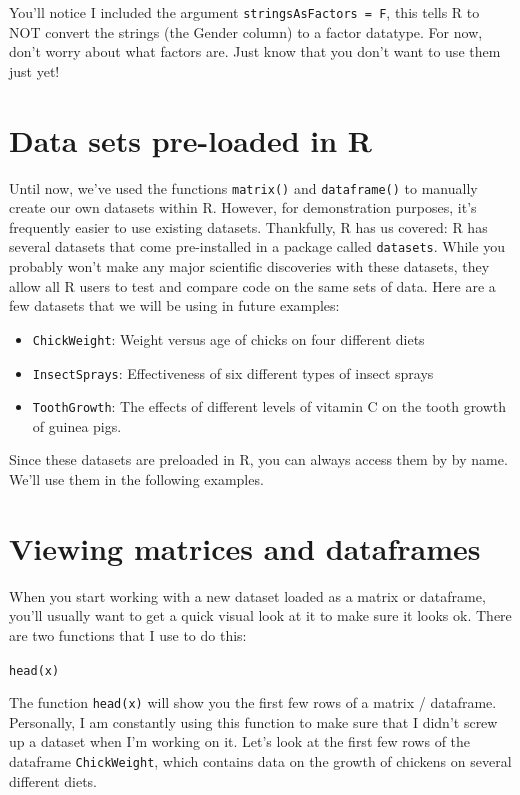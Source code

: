 \documentclass{tufte-book}\usepackage[]{graphicx}\usepackage[]{color}
\newcommand{\newfun}[1]{\begin{LARGE} \begin{center} \texttt{#1} \end{center} \end{LARGE}}
\begin{document}
\begin{footnotesize}
You'll notice I included the argument \texttt{stringsAsFactors = F}, this tells R to NOT convert the strings (the Gender column) to a factor datatype. For now, don't worry about what factors are. Just know that you don't want to use them just yet!

\section{Data sets pre-loaded in R}

Until now, we've used the functions \texttt{matrix()} and \texttt{dataframe()} to manually create our own datasets within R. However, for demonstration purposes, it's frequently easier to use existing datasets. Thankfully, R has us covered: R has several datasets that come pre-installed in a package called \texttt{datasets}. While you probably won't make any major scientific discoveries with these datasets, they allow all R users to test and compare code on the same sets of data. Here are a few datasets that we will be using in future examples:

\begin{itemize}
  \item \texttt{ChickWeight}: Weight versus age of chicks on four different diets
  \item \texttt{InsectSprays}: Effectiveness of six different types of insect sprays
  \item \texttt{ToothGrowth}: The effects of different levels of vitamin C on the tooth growth of guinea pigs.
\end{itemize}

Since these datasets are preloaded in R, you can always access them by by name. We'll use them in the following examples.

\section{Viewing matrices and dataframes}

When you start working with a new dataset loaded as a matrix or dataframe, you'll usually want to get a quick visual look at it to make sure it looks ok. There are two functions that I use to do this:

\newfun{head(x)}

The function \texttt{head(x)} will show you the first few rows of a matrix / dataframe. Personally, I am constantly using this function to make sure that I didn't screw up a dataset when I'm working on it. Let's look at the first few rows of the dataframe \texttt{ChickWeight}, which contains data on the growth of chickens on several different diets.


\end{footnotesize}
\end{document}

